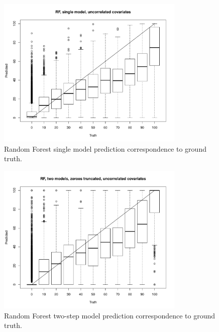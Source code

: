 \documentclass[a4paper,10pt]{article}
\begin{document}
\begin{figure}
    \includegraphics[width=0.8\textwidth]{article-figures/boxplots/2019-03-19-rf-1m-uncor-box}
    \caption{Random Forest single model prediction correspondence to ground truth.}
    \label{box-rf-1m-uncor-hm}
\end{figure}
\begin{figure}
    \includegraphics[width=0.8\textwidth]{article-figures/boxplots/2019-03-19-rf-2m-uncor-box}
    \caption{Random Forest two-step model prediction correspondence to ground truth.}
    \label{box-rf-2m-uncor-hm}
\end{figure}
\end{document}
